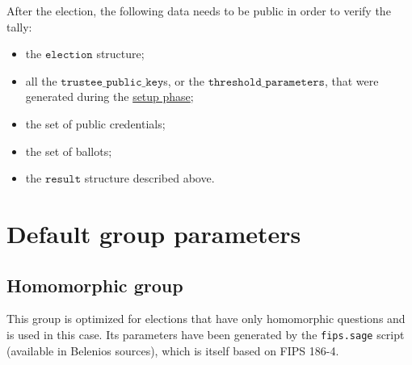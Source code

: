 \documentclass[a4paper]{article}
\newcommand{\tpk}{\texttt{trustee\_public\_key}}
\newcommand{\election}{\texttt{election}}
\newcommand{\result}{\texttt{result}}
\begin{document}
After the election, the following data needs to be public in order to
verify the tally:
\begin{itemize}
\item the $\election$ structure;
\item all the $\tpk$s, or the $\texttt{threshold\_parameters}$, that
  were generated during the \hyperref[election-setup]{setup phase};
\item the set of public credentials;
\item the set of ballots;
\item the $\result$ structure described above.
\end{itemize}

\section{Default group parameters}
\label{default-group}

\subsection{Homomorphic group}
\label{h-group}

This group is optimized for elections that have only homomorphic
questions and is used in this case. Its parameters have been generated
by the \verb=fips.sage= script (available in Belenios sources), which
is itself based on FIPS 186-4.
\end{document}
